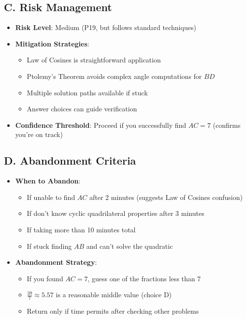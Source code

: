 \documentclass[11pt]{article}
\begin{document}
\begin{competitionbox}
\subsection*{C. Risk Management}
\begin{itemize}[leftmargin=*]
    \item \textbf{Risk Level}: Medium (P19, but follows standard techniques)
    \item \textbf{Mitigation Strategies}:
    \begin{itemize}
        \item Law of Cosines is straightforward application
        \item Ptolemy's Theorem avoids complex angle computations for $BD$
        \item Multiple solution paths available if stuck
        \item Answer choices can guide verification
    \end{itemize}
    \item \textbf{Confidence Threshold}: Proceed if you successfully find $AC = 7$ (confirms you're on track)
\end{itemize}

\subsection*{D. Abandonment Criteria}
\begin{itemize}[leftmargin=*]
    \item \textbf{When to Abandon}:
    \begin{itemize}
        \item If unable to find $AC$ after 2 minutes (suggests Law of Cosines confusion)
        \item If don't know cyclic quadrilateral properties after 3 minutes
        \item If taking more than 10 minutes total
        \item If stuck finding $AB$ and can't solve the quadratic
    \end{itemize}
    \item \textbf{Abandonment Strategy}:
    \begin{itemize}
        \item If you found $AC = 7$, guess one of the fractions less than 7
        \item $\frac{39}{7} \approx 5.57$ is a reasonable middle value (choice D)
        \item Return only if time permits after checking other problems
    \end{itemize}
\end{itemize}


\end{competitionbox}
\end{document}
